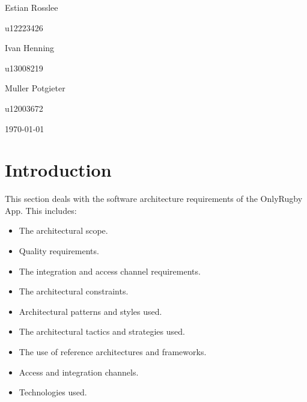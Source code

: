 \documentclass[hidelinks,a4paper,12pt]{article}
\begin{document}
\begin{titlepage}
\begin{center}
\begin{minipage}{0.4\textwidth}
\begin{flushleft} \large
Estian {Rosslee}
\end{flushleft}
\end{minipage}
\begin{minipage}{0.4\textwidth}
\begin{flushright} \large
\emph{}
u12223426
\end{flushright}
\end{minipage}

\begin{minipage}{0.4\textwidth}
\begin{flushleft} \large
Ivan {Henning}
\end{flushleft}
\end{minipage}
\begin{minipage}{0.4\textwidth}
\begin{flushright} \large
\emph{}
u13008219
\end{flushright}
\end{minipage}

\begin{minipage}{0.4\textwidth}
\begin{flushleft} \large
Muller {Potgieter}
\end{flushleft}
\end{minipage}
\begin{minipage}{0.4\textwidth}
\begin{flushright} \large
\emph{}
u12003672
\end{flushright}
\end{minipage}

\vfill
{\large \today}
\end{center}
\end{titlepage}
\footnotesize
%
\normalsize


\tableofcontents
\newpage
{}

\newpage
\section{Introduction} This section deals with the software architecture requirements of the OnlyRugby App. This includes:
	\begin{itemize} 
		\item The architectural scope.
		\item Quality requirements.
		\item The integration and access channel requirements.
		\item The architectural constraints.
		\item Architectural patterns and styles used.
		\item The architectural tactics and strategies used.
		\item The use of reference architectures and frameworks.
		\item Access and integration channels.
		\item Technologies used.
	\end{itemize}
\end{document}

